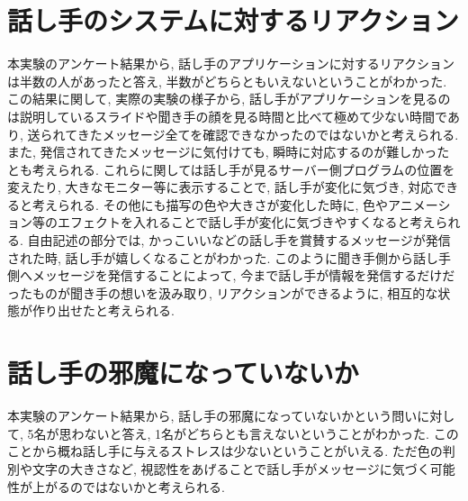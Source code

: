 \documentclass{funthesis}
\begin{document}
\section{話し手のシステムに対するリアクション}
本実験のアンケート結果から, 話し手のアプリケーションに対するリアクションは半数の人があったと答え, 半数がどちらともいえないということがわかった. この結果に関して, 実際の実験の様子から, 話し手がアプリケーションを見るのは説明しているスライドや聞き手の顔を見る時間と比べて極めて少ない時間であり, 送られてきたメッセージ全てを確認できなかったのではないかと考えられる. また, 発信されてきたメッセージに気付けても, 瞬時に対応するのが難しかったとも考えられる. これらに関しては話し手が見るサーバー側プログラムの位置を変えたり, 大きなモニター等に表示することで, 話し手が変化に気づき, 対応できると考えられる. その他にも描写の色や大きさが変化した時に, 色やアニメーション等のエフェクトを入れることで話し手が変化に気づきやすくなると考えられる. 自由記述の部分では, かっこいいなどの話し手を賞賛するメッセージが発信された時, 話し手が嬉しくなることがわかった. このように聞き手側から話し手側へメッセージを発信することによって, 今まで話し手が情報を発信するだけだったものが聞き手の想いを汲み取り, リアクションができるように, 相互的な状態が作り出せたと考えられる. 


\section{話し手の邪魔になっていないか}
本実験のアンケート結果から, 話し手の邪魔になっていないかという問いに対して, 5名が思わないと答え, 1名がどちらとも言えないということがわかった. このことから概ね話し手に与えるストレスは少ないということがいえる. ただ色の判別や文字の大きさなど, 視認性をあげることで話し手がメッセージに気づく可能性が上がるのではないかと考えられる. 




\end{document}
